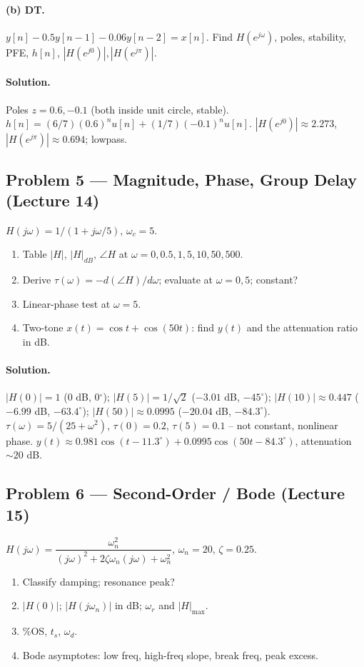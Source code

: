 \documentclass[11pt]{article}
\begin{document}
\paragraph{(b) DT.} $y[n]-0.5 y[n-1]-0.06y[n-2] = x[n]$. Find $H(e^{j\omega})$, poles, stability, PFE, $h[n]$, $|H(e^{j0})|,|H(e^{j\pi})|$.

\paragraph{Solution.} Poles $z=0.6, -0.1$ (both inside unit circle, stable). $h[n] = (6/7)(0.6)^n u[n] + (1/7)(-0.1)^n u[n]$. $|H(e^{j0})|\approx 2.273$, $|H(e^{j\pi})|\approx 0.694$; lowpass.

\subsection{Problem 5 --- Magnitude, Phase, Group Delay (Lecture 14)}
$H(j\omega) = 1/(1+j\omega/5)$, $\omega_c=5$.
\begin{enumerate}[label=(\alph*)]
  \item Table $|H|$, $|H|_{dB}$, $\angle H$ at $\omega=0, 0.5, 1, 5, 10, 50, 500$.
  \item Derive $\tau(\omega) = -d(\angle H)/d\omega$; evaluate at $\omega=0,5$; constant?
  \item Linear-phase test at $\omega=5$.
  \item Two-tone $x(t)=\cos t + \cos(50t)$: find $y(t)$ and the attenuation ratio in dB.
\end{enumerate}

\paragraph{Solution.} $|H(0)|=1$ (0 dB, 0$^\circ$); $|H(5)|=1/\sqrt 2$ ($-3.01$ dB, $-45^\circ$); $|H(10)|\approx 0.447$ ($-6.99$ dB, $-63.4^\circ$); $|H(50)|\approx 0.0995$ ($-20.04$ dB, $-84.3^\circ$). $\tau(\omega)=5/(25+\omega^2)$, $\tau(0)=0.2$, $\tau(5)=0.1$ -- not constant, nonlinear phase. $y(t)\approx 0.981\cos(t-11.3^\circ)+0.0995\cos(50t-84.3^\circ)$, attenuation $\sim 20$ dB.

\subsection{Problem 6 --- Second-Order / Bode (Lecture 15)}
$H(j\omega) = \dfrac{\omega_n^2}{(j\omega)^2+2\zeta\omega_n(j\omega)+\omega_n^2}$, $\omega_n=20$, $\zeta=0.25$.
\begin{enumerate}[label=(\alph*)]
  \item Classify damping; resonance peak?
  \item $|H(0)|$; $|H(j\omega_n)|$ in dB; $\omega_r$ and $|H|_{\max}$.
  \item \%OS, $t_s$, $\omega_d$.
  \item Bode asymptotes: low freq, high-freq slope, break freq, peak excess.
\end{enumerate}
\end{document}
